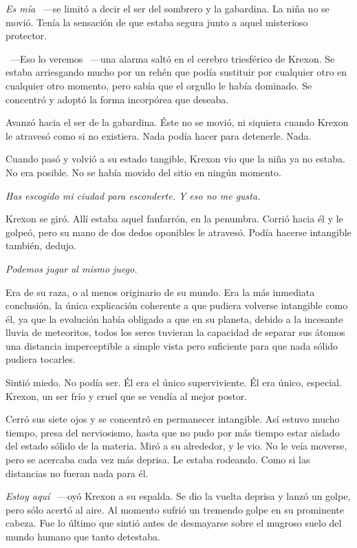 \emph{Es mía} ~---se limitó a decir el ser del sombrero y la gabardina. La niña no se movió. Tenía la sensación de que estaba segura junto a aquel misterioso protector.

~---Eso lo veremos ~---una alarma saltó en el cerebro triesférico de Krexon. Se estaba arriesgando mucho por un rehén que podía sustituir por cualquier otro en cualquier otro momento, pero sabía que el orgullo le había dominado. Se concentró y adoptó la forma incorpórea que deseaba.

Avanzó hacia el ser de la gabardina. Éste no se movió, ni siquiera cuando Krexon le atravesó como si no existiera. Nada podía hacer para detenerle. Nada.

Cuando pasó y volvió a su estado tangible, Krexon vio que la niña ya no estaba. No era posible. No se había movido del sitio en ningún momento.

\emph{Has escogido mi ciudad para esconderte. Y eso no me gusta.}

Krexon se giró. Allí estaba aquel fanfarrón, en la penumbra. Corrió hacia él y le golpeó, pero su mano de dos dedos oponibles le atravesó. Podía hacerse intangible también, dedujo.

\emph{Podemos jugar al mismo juego.}

Era de su raza, o al menos originario de su mundo. Era la más inmediata conclusión, la única explicación coherente a que pudiera volverse intangible como él, ya que la evolución había obligado a que en su planeta, debido a la incesante lluvia de meteoritos, todos los seres tuvieran la capacidad de separar sus átomos una distancia imperceptible a simple vista pero suficiente para que nada sólido pudiera tocarles.

Sintió miedo. No podía ser. Él era el único superviviente. Él era único, especial. Krexon, un ser frío y cruel que se vendía al mejor postor.

Cerró sus siete ojos y se concentró en permanecer intangible. Así estuvo mucho tiempo, presa del nerviosismo, hasta que no pudo por más tiempo estar aislado del estado sólido de la materia. Miró a su alrededor, y le vio. No le veía moverse, pero se acercaba cada vez más deprisa. Le estaba rodeando. Como si las distancias no fueran nada para él.

\emph{Estoy aquí} ~---oyó Krexon a su espalda. Se dio la vuelta deprisa y lanzó un golpe, pero sólo acertó al aire. Al momento sufrió un tremendo golpe en su prominente cabeza. Fue lo último que sintió antes de desmayarse sobre el mugroso suelo del mundo humano que tanto detestaba.


